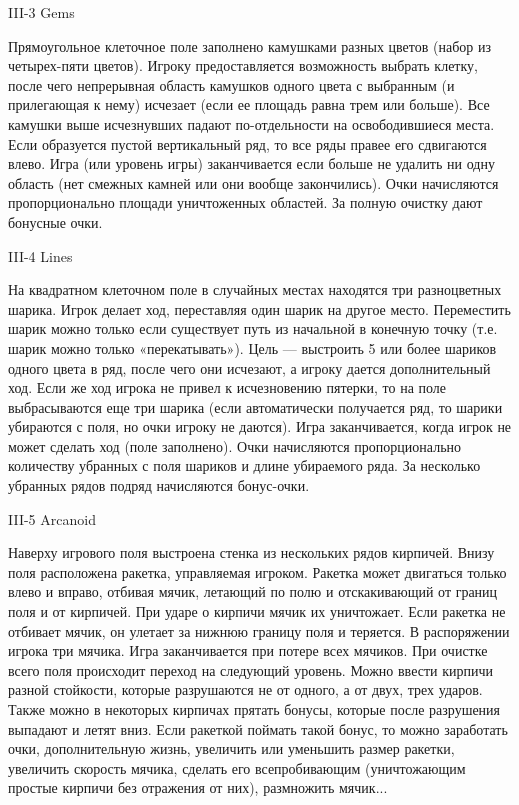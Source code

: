 
III-3 Gems

Прямоугольное клеточное поле заполнено камушками разных цветов (набор из
четырех-пяти цветов). Игроку предоставляется возможность выбрать клетку, после
чего непрерывная область камушков одного цвета с выбранным (и прилегающая к
нему) исчезает (если ее площадь равна трем или больше). Все камушки выше
исчезнувших падают по-отдельности на освободившиеся места. Если образуется
пустой вертикальный ряд, то все ряды правее его сдвигаются влево. Игра (или
уровень игры) заканчивается если больше не удалить ни одну область (нет
смежных камней или они вообще закончились). Очки начисляются пропорционально
площади уничтоженных областей. За полную очистку дают бонусные очки.


III-4 Lines

На квадратном клеточном поле в случайных местах находятся три разноцветных
шарика. Игрок делает ход, переставляя один шарик на другое место. Переместить
шарик можно только если существует путь из начальной в конечную точку (т.е.
шарик можно только «перекатывать»). Цель — выстроить 5 или более шариков
одного цвета в ряд, после чего они исчезают, а игроку дается дополнительный
ход. Если же ход игрока не привел к исчезновению пятерки, то на поле
выбрасываются еще три шарика (если автоматически получается ряд, то шарики
убираются с поля, но очки игроку не даются). Игра заканчивается, когда игрок
не может сделать ход (поле заполнено). Очки начисляются пропорционально
количеству убранных с поля шариков и длине убираемого ряда. За несколько
убранных рядов подряд начисляются бонус-очки.


III-5 Arcanoid

Наверху игрового поля выстроена стенка из нескольких рядов кирпичей. Внизу
поля расположена ракетка, управляемая игроком. Ракетка может двигаться только
влево и вправо, отбивая мячик, летающий по полю и отскакивающий от границ поля
и от кирпичей. При ударе о кирпичи мячик их уничтожает. Если ракетка не
отбивает мячик, он улетает за нижнюю границу поля и теряется. В распоряжении
игрока три мячика. Игра заканчивается при потере всех мячиков. При очистке
всего поля происходит переход на следующий уровень. Можно ввести кирпичи
разной стойкости, которые разрушаются не от одного, а от двух, трех ударов.
Также можно в некоторых кирпичах прятать бонусы, которые после разрушения
выпадают и летят вниз. Если ракеткой поймать такой бонус, то можно заработать
очки, дополнительную жизнь, увеличить или уменьшить размер ракетки, увеличить
скорость мячика, сделать его всепробивающим (уничтожающим простые кирпичи без
отражения от них), размножить мячик...

